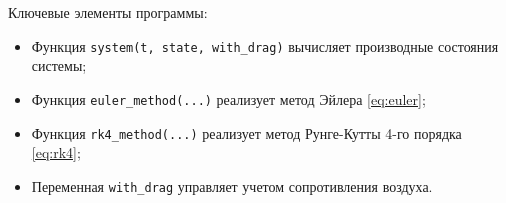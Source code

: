 \inputminted[frame=lines, framesep=5mm, baselinestretch=1.2, fontsize=\small, linenos]{python}{code/motion_simulation.py}

Ключевые элементы программы:

\begin{itemize}
    \item Функция \texttt{system(t, state, with_drag)} вычисляет производные состояния системы;
    \item Функция \texttt{euler_method(...)} реализует метод Эйлера \eqref{eq:euler};
    \item Функция \texttt{rk4_method(...)} реализует метод Рунге-Кутты 4-го порядка \eqref{eq:rk4};
    \item Переменная \texttt{with\_drag} управляет учетом сопротивления воздуха.
\end{itemize}